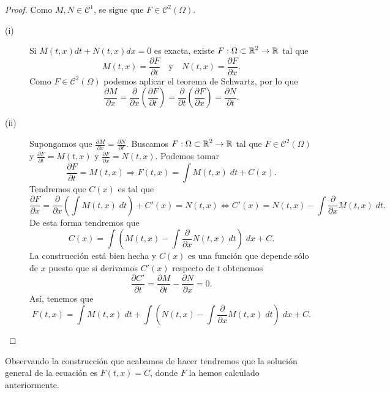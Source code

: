 \begin{proof}
	Como $\displaystyle M,N \in \mathcal{C}^{1} $, se sigue que $\displaystyle F\in\mathcal{C}^{2}\left(\Omega \right) $. 
\begin{description}
\item[(i)] Si $\displaystyle M\left(t,x\right)dt + N\left(t,x\right)dx = 0 $ es exacta, existe $\displaystyle F : \Omega\subset\mathbb{R}^{2} \to \mathbb{R}$ tal que 
	\[M\left(t,x\right)=\frac{\partial F}{\partial t}\quad \text{y} \quad N\left(t,x\right)=\frac{\partial F}{\partial x} .\]
Como $\displaystyle F \in \mathcal{C}^{2}\left(\Omega \right) $ podemos aplicar el teorema de Schwartz, por lo que 
\[\frac{\partial M}{\partial x}= \frac{\partial }{\partial x}\left(\frac{\partial F}{\partial t}\right)= \frac{\partial }{\partial t}\left(\frac{\partial F}{\partial x}\right)= \frac{\partial N}{\partial t} .\]
\item[(ii)] Supongamos que $\displaystyle \frac{\partial M}{\partial x}= \frac{\partial N}{\partial t} $. Buscamos $\displaystyle F : \Omega\subset \mathbb{R}^{2} \to \mathbb{R} $ tal que $\displaystyle F \in \mathcal{C}^{2}\left(\Omega \right) $ y $\displaystyle \frac{\partial F}{\partial t}=M\left(t,x\right) $ y $\displaystyle \frac{\partial F}{\partial x}= N\left(t,x\right) $. Podemos tomar
	\[\frac{\partial F}{\partial t}=M\left(t,x\right) \Rightarrow F\left(t,x\right)=\int M\left(t,x\right) \; dt + C\left(x\right) .\]
Tendremos que $\displaystyle C\left(x\right) $ es tal que 
\[\frac{\partial F}{\partial x}= \frac{\partial }{\partial x}\left(\int M\left(t,x\right) \; dt\right)+C'\left(x\right)=N\left(t,x\right) \iff C'\left(x\right)=N\left(t,x\right)-\int \frac{\partial }{\partial x}M\left(t,x\right) \; dt .\]
De esta forma tendremos que 
\[C\left(x\right)=\int \left(M\left(t,x\right)-\int \frac{\partial }{\partial x}N\left(t, x\right) \; dt\right) \; dx + C .\]
La construcción está bien hecha y $\displaystyle C\left(x\right) $ es una función que depende sólo de $\displaystyle x $ puesto que si derivamos $\displaystyle C'\left(x\right) $ respecto de $\displaystyle t $ obtenemos 
\[\frac{\partial C'}{\partial t} = \frac{\partial M}{\partial t}-\frac{\partial N}{\partial x}= 0 .\]
Así, tenemos que 
\[F\left(t,x\right)=\int M\left(t,x\right) \; dt + \int \left(N\left(t,x\right) -\int \frac{\partial }{\partial x}M\left(t,x\right) \; dt\right) \; dx + C .\]
\end{description}
\end{proof}
\begin{observation}
Observando la construcción que acabamos de hacer tendremos que la solución general de la ecuación es $\displaystyle F\left(t,x\right)=C $, donde $\displaystyle F $ la hemos calculado anteriormente. 
\end{observation}

